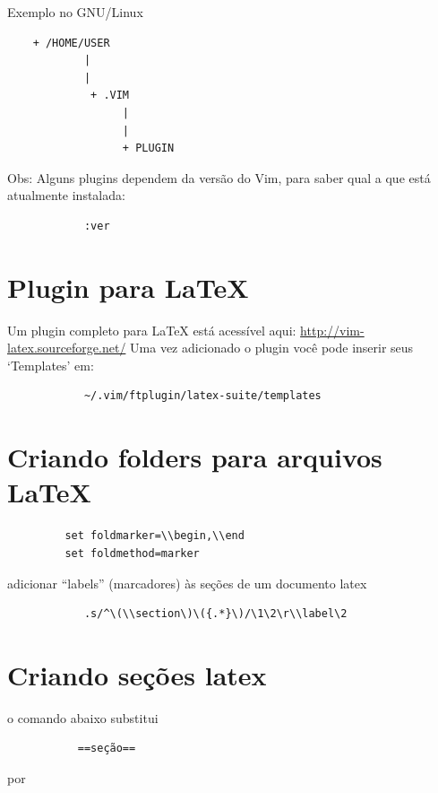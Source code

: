 \documentclass[10pt,a4paper,openany]{book}
\begin{document}
Exemplo no GNU/Linux

\begin{verbatim}
	+ /HOME/USER
			|
			|
			 + .VIM
				  |
				  |
				  + PLUGIN
\end{verbatim}

Obs: Alguns plugins dependem da versão do Vim, para saber qual
a que está atualmente instalada:

\begin{verbatim}
			:ver
\end{verbatim}

\section{Plugin para LaTeX}
\label{Plugin para LaTeX}
Um plugin completo para LaTeX está acessível aqui: \url{http://vim-latex.sourceforge.net/}
Uma vez adicionado o plugin você pode inserir seus `Templates'
em:

\begin{verbatim}
			~/.vim/ftplugin/latex-suite/templates
\end{verbatim}


\section{Criando folders para arquivos LaTeX}
\label{Criando folders para arquivos LaTeX}

\begin{verbatim}
		 set foldmarker=\\begin,\\end
		 set foldmethod=marker
\end{verbatim}

adicionar ``labels'' (marcadores) às seções de um documento latex
\begin{verbatim}
			.s/^\(\\section\)\({.*}\)/\1\2\r\\label\2
\end{verbatim}

\section{Criando seções latex}\label{Criando seções latex}
o comando abaixo substitui

\begin{verbatim}
		   ==seção==
\end{verbatim}

   por
\end{document}
